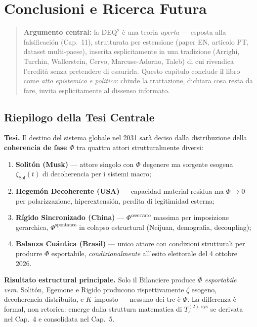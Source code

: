 \chapter{Conclusioni e Ricerca
Futura}\label{conclusioni-e-ricerca-futura}

\begin{quote}
\textbf{Argumento central:} la DEQ$^2$ è una teoria \emph{aperta} ---
esposta alla falsificación (Cap.~11), strutturata per estensione (paper
EN, articolo PT, dataset multi-paese), inserita esplicitamente in una
tradizione (Arrighi, Turchin, Wallerstein, Cervo, Marcuse-Adorno, Taleb)
di cui rivendica l'eredità senza pretendere di esaurirla. Questo
capítulo conclude il libro come \emph{atto epistemico e politico}:
chiude la trattazione, dichiara cosa resta da fare, invita
esplicitamente al dissenso informato.
\end{quote}



\section{Riepilogo della Tesi
Centrale}\label{riepilogo-della-tesi-centrale}

\Proved{} \textbf{Tesi.} Il destino del sistema globale nel 2031 sarà
deciso dalla distribuzione della \textbf{coherencia de fase \(\Phi\)} tra
quattro attori strutturalmente diversi:

\begin{enumerate}
\def\labelenumi{\arabic{enumi}.}
\tightlist
\item
  \textbf{Solitón (Musk)} --- attore singolo con \(\Phi\) degenere ma
  sorgente esogena \(\zeta_{\text{Sol}}(t)\) di decoherencia per i sistemi
  macro;
\item
  \textbf{Hegemón Decoherente (USA)} --- capacidad material residua ma
  \(\Phi \to 0\) per polarizzazione, hiperextensión, perdita di
  legitimidad esterna;
\item
  \textbf{Rígido Sincronizado (China)} --- \(\Phi^{\text{osservato}}\)
  massima per imposizione gerarchica, \(\Phi^{\text{spontaneo}}\) in
  colapso estructural (Neijuan, demografia, decoupling);
\item
  \textbf{Balanza Cuántica (Brasil)} --- unico attore con
  condizioni strutturali per produrre \(\Phi\) esportabile,
  \emph{condizionalmente} all'esito elettorale del 4 ottobre 2026.
\end{enumerate}

\Hypoth{} \textbf{Risultato estructural principale.} Solo il Bilanciere
produce \emph{\(\Phi\) esportabile vera}. Solitón, Egemone e Rigido
producono rispettivamente \(\zeta\) esogeno, decoherencia distribuita, e
\(K\) imposto --- nessuno dei tre è \(\Phi\). La differenza è formal,
non retorica: emerge dalla struttura matematica di
\(T_s^{(2),\text{sys}}\) se derivata nel Cap.~4 e consolidata nel Cap.~5.



